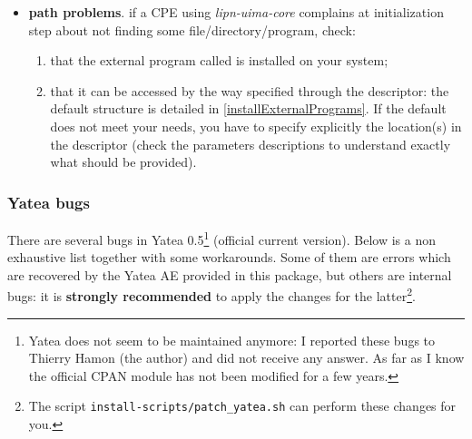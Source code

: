 \documentclass{article}
\newenvironment{xenumerate}{
\begin{enumerate}
  \setlength{\itemsep}{.3\baselineskip}
  \setlength{\topsep}{0pt}
  \setlength{\parskip}{0pt}
  \setlength{\parsep}{0pt}
}{\end{enumerate}}
\newenvironment{xitemize}{
\begin{itemize}
  \setlength{\itemsep}{.3\baselineskip}
  \setlength{\topsep}{0pt}
  \setlength{\parskip}{0pt}
  \setlength{\parsep}{0pt}
}{\end{itemize}}
\newcommand{\uimaModule}{{\em lipn-uima-core}\xspace}
\begin{document}
\begin{xitemize}
\item {\bf path problems}. if a CPE using \uimaModule complains at initialization step about not finding some file/directory/program, check: 
\begin{xenumerate}
\item that the external program called is installed on your system;
\item that it can be accessed by the way specified through the descriptor: the default structure is detailed in \ref{installExternalPrograms}. If the default does not meet your needs, you have to specify explicitly the location(s) in the descriptor (check the parameters descriptions to understand exactly what should be provided).
\end{xenumerate}
\end{xitemize}

\subsubsection{Yatea bugs}
\label{yateaBugs}

There are several bugs in Yatea 0.5\footnote{Yatea does not seem to be maintained anymore: I reported these bugs to Thierry Hamon (the author) and did not receive any answer. As far as I know the official CPAN module has not been modified for a few years.} (official current version). Below is a non exhaustive list together with some workarounds. Some of them are errors which are recovered by the Yatea AE provided in this package, but others are internal bugs: it is {\bf strongly recommended} to apply the changes for the latter\footnote{The script {\tt install-scripts/patch\_yatea.sh} can perform these changes for you.}.
\end{document}
